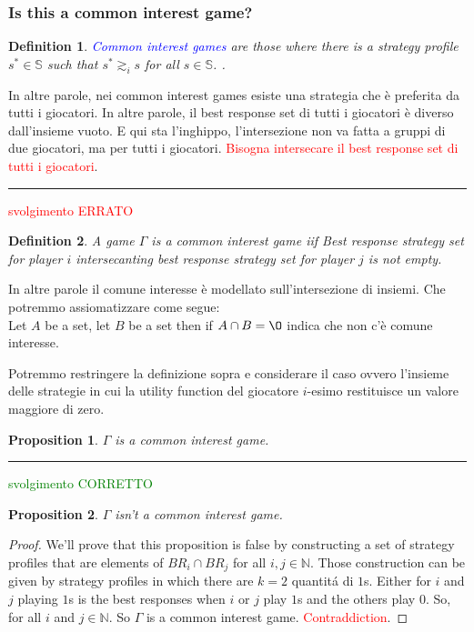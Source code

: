 \documentclass{article}
\newtheorem{defn}{Definition}
\newtheorem{prop}{Proposition}
\begin{document}
\subsubsection{Is this a common interest game?}

\begin{defn}
	\textcolor{blue}{Common interest games} are those where there is a strategy profile $s^* \in \mathbb{S}$ such that $s^* \gtrsim_i s$ for all $s \in \mathbb{S}$. \cite{rossi01}.
\end{defn}

In altre parole, nei common interest games esiste una strategia che \`e preferita da tutti i giocatori. In altre parole, il best response set di tutti i giocatori \`e diverso dall'insieme vuoto. E qui sta l'inghippo, l'intersezione non va fatta a gruppi di due giocatori, ma per tutti i giocatori. \textcolor{red}{Bisogna intersecare il best response set di tutti i giocatori}.

\noindent
{\color{blue} \rule{\linewidth}{0.5mm} }
\textcolor{red}{svolgimento ERRATO}

\begin{defn}
	A game $\Gamma$ is a common interest game iif Best response strategy set for player $i$ intersecanting best response strategy set for player $j$ is not empty. 
\end{defn}

In altre parole il comune interesse \`e modellato sull'intersezione di insiemi. Che potremmo assiomatizzare come segue: \\

Let $A$ be a set, let $B$ be a set then if $A \cap B = \O$ indica che non c'\`e comune interesse. 

Potremmo restringere la definizione sopra e considerare il caso ovvero l'insieme delle strategie in cui la utility function del giocatore $i$-esimo restituisce un valore maggiore di zero.

\begin{prop}
 $\Gamma$ is a common interest game.
\end{prop}


\noindent
{\color{blue} \rule{\linewidth}{0.5mm} }
\textcolor{green}{svolgimento CORRETTO}

\begin{prop}
	$\Gamma$ isn't a common interest game.
\end{prop}

\begin{proof}
	We'll prove that this proposition is false by constructing a set of strategy profiles that are elements of $BR_i \cap BR_j$ for all $i,j \in \mathbb{N}$. Those construction can be given by strategy profiles in which there are $k=2$ quantit\'a di $1$s.
	Either for $i$ and $j$ playing $1$s is the best responses when $i$ or $j$ play $1$s and the others play $0$. So, for all $i$ and $j \in \mathbb{N}$. So $\Gamma$ is a common interest game. \textcolor{red}{Contraddiction}. 
\end{proof}
\end{document}
